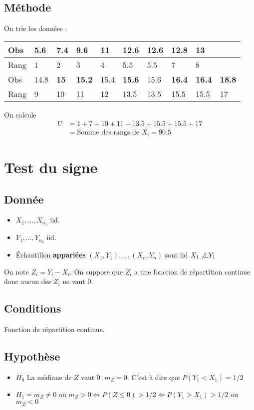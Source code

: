 \documentclass{article}
\theoremstyle{plain}%
\theoremstyle{definition}
\theoremstyle{remark}
\begin{document}
\subsection*{Méthode}
On trie les données :
\begin{table}[!ht]
    \centering
    \begin{tabular}{|l|l|l|l|l|l|l|l|l|l|}
    \hline
        Obs & \textbf{5.6} & 7.4 & 9.6 & 11 & 12.6 & 12.6 & \textbf{12.8} & 13 &  \\ \hline
        Rang & 1 & 2 & 3 & 4 & 5.5 & 5.5 & 7 & 8 &  \\ \hline
        Obs & 14.8 & \textbf{15} & \textbf{15.2} & 15.4 & \textbf{15.6} & 15.6 & \textbf{16.4} & \textbf{16.4} & \textbf{18.8} \\ \hline
        Rang & 9 & 10 & 11 & 12 & 13.5 & 13.5 & 15.5 & 15.5 & 17 \\ \hline
    \end{tabular}
\end{table}
On calcule
\begin{align*}
    U &= 1 + 7 + 10 + 11 + 13.5 + 15.5 + 15.5 + 17 \\ 
        &= \text{Somme des rangs de } X_i = 90.5
\end{align*}

\section{Test du signe}
\subsection*{Donnée}
\begin{itemize}
    \item $ X_1, \dots, X_{n_1}  $ iid. 
    \item $ Y_1, \dots, Y_{n_2}  $ iid. 
    \item Échantillon \textbf{appariées} $ (X_1, Y_1), \dots, (X_n, Y_n) $ sont iid $ X_1 \not \bot Y_1 $ 
\end{itemize}
On note $ Z_i = Y_i - X_i $. On suppose que $ Z_i $  a une fonction de répartition continue donc aucun des $ Z_i $ ne vaut 0.

\subsection*{Conditions}
Fonction de répartition continue.

\subsection*{Hypothèse}
\begin{itemize}
    \item $ H_0 $ La médiane de $ Z $ vaut 0. $ m_Z = 0 $. C'est à dire que $ P(Y_1 < X_1) = 1/2 $ 
    \item $ H_1 = m_Z \neq 0 $ ou $ m_Z > 0 \Leftrightarrow P(Z \leq 0) > 1/2 \Leftrightarrow P(Y_1 > X_1) > 1/2$ ou $ m_Z < 0 $ 
\end{itemize}
\end{document}
